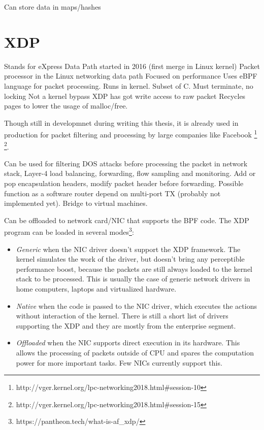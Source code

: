 Can store data in maps/hashes


\section{XDP}
Stands for eXpress Data Path 
started in 2016 (first merge in Linux kernel)
Packet processor in the Linux networking data path
Focused on performance
Uses eBPF language for packet processing.
Runs in kernel.
Subset of C.
Must terminate, no locking
Not a kernel bypass
XDP has got write access to raw packet
Recycles pages to lower the usage of malloc/free.

Though still in developmnet during writing this thesis, it is already used in production for packet filtering and processing by large companies like Facebook
\footnote{http://vger.kernel.org/lpc-networking2018.html\#session-10}
\footnote{http://vger.kernel.org/lpc-networking2018.html\#session-15}.

Can be used for filtering DOS attacks before processing the packet in network stack, Layer-4 load balancing, forwarding, flow sampling and monitoring.
Add or pop encapsulation headers, modify packet header before forwarding.
Possible function as a software router depend on multi-port TX (probably not implemented yet).
Bridge to virtual machines.

Can be offloaded to network card/NIC that supports the BPF code.
The XDP program can be loaded in several modes\footnote{https://pantheon.tech/what-is-af\_xdp/}:
\begin{itemize}
    \item \emph{Generic} when the NIC driver doesn't support the XDP framework.
        The kernel simulates the work of the driver, but doesn't bring any perceptible performance boost, because the packets are still always loaded to the kernel stack to be processed.
        This is usually the case of generic network drivers in home computers, laptops and virtualized hardware.
    \item \emph{Native} when the code is passed to the NIC driver, which executes the actions without interaction of the kernel.
        There is still a short list of drivers supporting the XDP and they are mostly from the enterprise segment.
    \item \emph{Offloaded} when the NIC supports direct execution in its hardware. This allows the processing of packets outside of CPU and spares the computation power for more important tasks. Few NICs currently support this.
\end{itemize}

